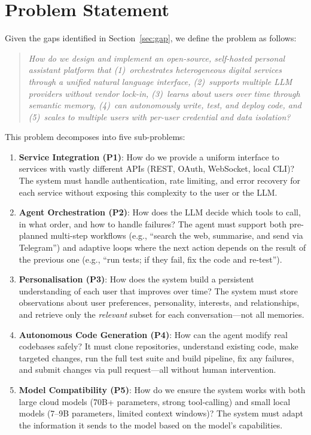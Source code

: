 \section{Problem Statement}
\label{sec:problem}

Given the gaps identified in Section~\ref{sec:gap}, we define the problem as follows:

\begin{quote}
\textit{How do we design and implement an open-source, self-hosted personal assistant platform that (1)~orchestrates heterogeneous digital services through a unified natural language interface, (2)~supports multiple LLM providers without vendor lock-in, (3)~learns about users over time through semantic memory, (4)~can autonomously write, test, and deploy code, and (5)~scales to multiple users with per-user credential and data isolation?}
\end{quote}

This problem decomposes into five sub-problems:

\begin{enumerate}[leftmargin=*]
  \item \textbf{Service Integration (P1)}: How do we provide a uniform interface to services with vastly different APIs (REST, OAuth, WebSocket, local CLI)? The system must handle authentication, rate limiting, and error recovery for each service without exposing this complexity to the user or the LLM.

  \item \textbf{Agent Orchestration (P2)}: How does the LLM decide which tools to call, in what order, and how to handle failures? The agent must support both pre-planned multi-step workflows (e.g., ``search the web, summarise, and send via Telegram'') and adaptive loops where the next action depends on the result of the previous one (e.g., ``run tests; if they fail, fix the code and re-test'').

  \item \textbf{Personalisation (P3)}: How does the system build a persistent understanding of each user that improves over time? The system must store observations about user preferences, personality, interests, and relationships, and retrieve only the \textit{relevant} subset for each conversation---not all memories.

  \item \textbf{Autonomous Code Generation (P4)}: How can the agent modify real codebases safely? It must clone repositories, understand existing code, make targeted changes, run the full test suite and build pipeline, fix any failures, and submit changes via pull request---all without human intervention.

  \item \textbf{Model Compatibility (P5)}: How do we ensure the system works with both large cloud models (70B+ parameters, strong tool-calling) and small local models (7--9B parameters, limited context windows)? The system must adapt the information it sends to the model based on the model's capabilities.
\end{enumerate}
